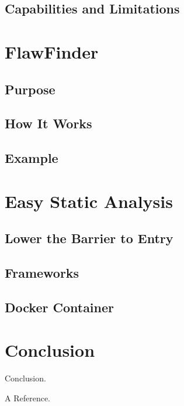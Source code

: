 \documentclass[journal]{IEEEtran}
\begin{document}
\subsection{Capabilities and Limitations}


\section{FlawFinder}

\subsection{Purpose}

\subsection{How It Works}

\subsection{Example}


\section{Easy Static Analysis}

\subsection{Lower the Barrier to Entry}

\subsection{Frameworks}

\subsection{Docker Container}


\section{Conclusion}
Conclusion.



\begin{thebibliography}{00}

 A Reference.

\end{thebibliography}
\end{document}
